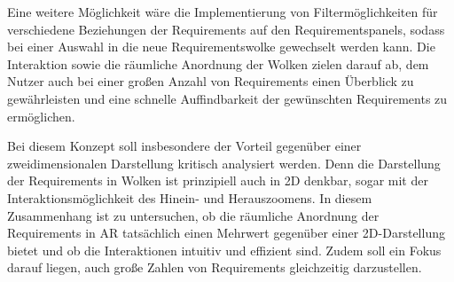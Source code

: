 Eine weitere Möglichkeit wäre die Implementierung von Filtermöglichkeiten für verschiedene Beziehungen der Requirements auf den Requirementspanels, sodass bei einer Auswahl in die neue Requirementswolke gewechselt werden kann.
Die Interaktion sowie die räumliche Anordnung der Wolken zielen darauf ab, dem Nutzer auch bei einer großen Anzahl von Requirements einen Überblick zu gewährleisten und eine schnelle Auffindbarkeit der gewünschten Requirements zu ermöglichen.

Bei diesem Konzept soll insbesondere der Vorteil gegenüber einer zweidimensionalen Darstellung kritisch analysiert werden.
Denn die Darstellung der Requirements in Wolken ist prinzipiell auch in 2D denkbar, sogar mit der Interaktionsmöglichkeit des Hinein- und Herauszoomens.
In diesem Zusammenhang ist zu untersuchen, ob die räumliche Anordnung der Requirements in AR tatsächlich einen Mehrwert gegenüber einer 2D-Darstellung bietet und ob die Interaktionen intuitiv und effizient sind.
Zudem soll ein Fokus darauf liegen, auch große Zahlen von Requirements gleichzeitig darzustellen.

